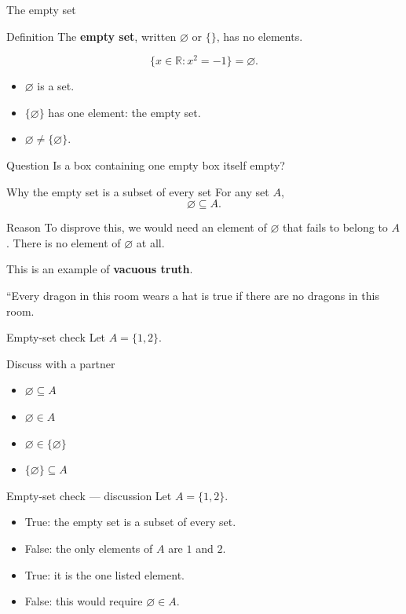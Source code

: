 \documentclass{beamer}
\newcommand{\R}{\mathbb{R}}
\begin{document}
\begin{frame}{The empty set}
\begin{block}{Definition}
The \textbf{empty set}, written $\varnothing$ or $\{\}$, has no elements.
\end{block}\[\{x\in\R:x^2=-1\}=\varnothing.\]\begin{itemize}
\item $\varnothing$ is a set.
\item $\{\varnothing\}$ has one element: the empty set.
\item $\varnothing\ne\{\varnothing\}$.
\end{itemize}\begin{block}{Question}
Is a box containing one empty box itself empty?
\end{block}
\end{frame}
\begin{frame}{Why the empty set is a subset of every set}
For any set $A$,\[\varnothing\subseteq A.\]\begin{block}{Reason}
To disprove this, we would need an element of $\varnothing$ that fails to belong to $A$. There is no element of $\varnothing$ at all.
\end{block}\medskip This is an example of \textbf{vacuous truth}.\medskip\par ``Every dragon in this room wears a hat is true if there are no dragons in this room.
\end{frame}
\begin{frame}{Empty-set check}
Let $A=\{1,2\}$.
\begin{block}{Discuss with a partner}
\begin{itemize}
\item $\varnothing\subseteq A$
\item $\varnothing\in A$
\item $\varnothing\in\{\varnothing\}$
\item $\{\varnothing\}\subseteq A$
\end{itemize}
\end{block}
\end{frame}
\begin{frame}{Empty-set check --- discussion}
Let $A=\{1,2\}$.
\begin{itemize}
\item True: the empty set is a subset of every set.
\item False: the only elements of $A$ are $1$ and $2$.
\item True: it is the one listed element.
\item False: this would require $\varnothing\in A$.
\end{itemize}
\end{frame}
\end{document}
